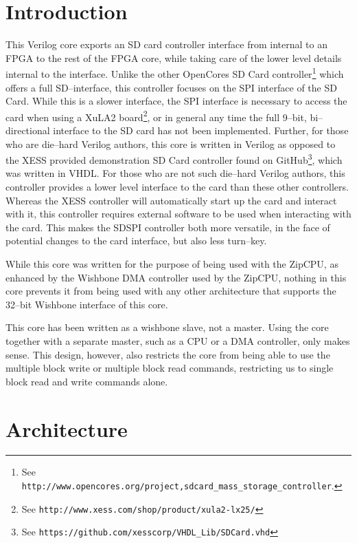 \documentclass{gqtekspec}
\begin{document}
\chapter{Introduction}
\setcounter{page}{1}

This Verilog core exports an SD card controller interface from internal to an
FPGA to the rest of the FPGA core, while taking care of the lower level details
internal to the interface.
Unlike the other OpenCores SD Card controller\footnote{See
\texttt{http://www.opencores.org/project,sdcard\_mass\_storage\_controller}.}
which offers a full SD--interface, this controller focuses on the SPI interface
of the SD Card.  While this is a slower interface, the SPI interface is
necessary to access the card when using a XuLA2
board\footnote{See \texttt{http://www.xess.com/shop/product/xula2-lx25/}}, or
in general any time the full 9--bit, bi--directional interface to the SD card
has not been implemented.
Further, for those who are die--hard Verilog authors, this core is written in
Verilog as opposed to the XESS provided demonstration SD Card controller
found on GitHub\footnote{See
\texttt{https://github.com/xesscorp/VHDL\_Lib/SDCard.vhd}}, which was written
in VHDL.  For those who are not such die--hard Verilog authors, this controller
provides a lower level interface to the card than these other controllers. 
Whereas the XESS controller will automatically start up the card and interact
with it, this controller requires external software to be used when interacting
with the card.  This makes the SDSPI controller both more versatile, in the
face of potential changes to the card interface, but also less turn--key.

While this core was written for the purpose of being used with the ZipCPU,
as enhanced by the Wishbone DMA controller used by the ZipCPU, nothing in this
core prevents it from being used with any other architecture that supports
the 32--bit Wishbone interface of this core.

This core has been written as a wishbone slave, not a master.  Using the core
together with a separate master, such as a CPU or a DMA controller, only makes
sense.  This design, however, also restricts the core from being able to use
the multiple block write or multiple block read commands, restricting us to 
single block read and write commands alone.

\chapter{Architecture}\label{ch:arch}
\end{document}

